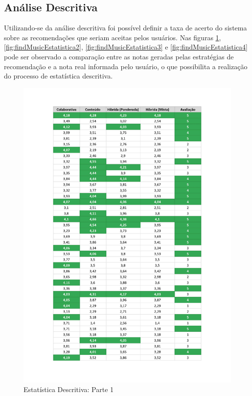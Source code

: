 \subsection{Análise Descritiva}

Utilizando-se da análise descritiva foi possível definir a taxa de acerto do sistema sobre as recomendações que seriam aceitas pelos usuários. Nas figuras \ref{fig:findMusicEstatistica1}, \ref{fig:findMusicEstatistica2}, \ref{fig:findMusicEstatistica3} e \ref{fig:findMusicEstatistica4} pode ser observado a comparação entre as notas geradas pelas estratégias de recomendação e a nota real informada pelo usuário, o que possibilita a realização do processo de estatística descritiva.

\begin{figure}[H]
	\centering
	\includegraphics[width=.8\linewidth]{imagens/findMusicResultados1.jpg}
	\caption[Estatística Descritiva: Parte 1]{Estatística Descritiva: Parte 1}
    \label{fig:findMusicEstatistica1}
\end{figure}

